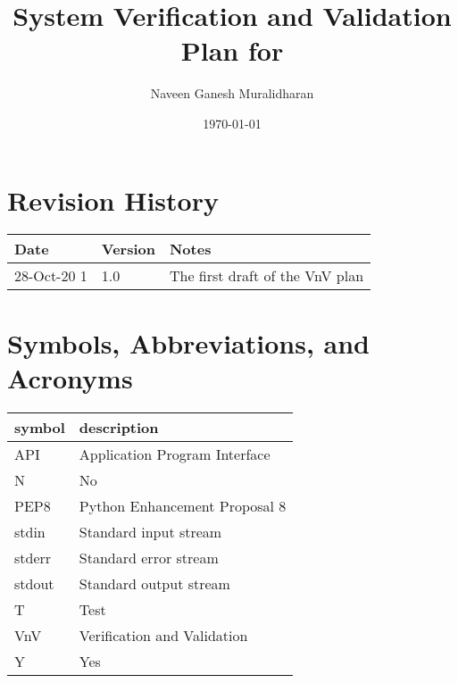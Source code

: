 \documentclass[12pt, titlepage]{article}
\begin{document}
\title{System Verification and Validation Plan for \progname{}} 
\author{Naveen Ganesh Muralidharan}
\date{\today}
	
\maketitle


\section{Revision History}

\begin{tabularx}{\textwidth}{p{3cm}p{2cm}X}
\toprule {\bf Date} & {\bf Version} & {\bf Notes}\\
\midrule
28-Oct-20 1 & 1.0 & The first draft of the VnV plan\\
\bottomrule
\end{tabularx}

\newpage

\tableofcontents

\listoftables

\newpage

\section{Symbols, Abbreviations, and Acronyms}

\renewcommand{\arraystretch}{1.2}
\begin{tabular}{l l} 
  \toprule		
  \textbf{symbol} & \textbf{description}\\
  \midrule 
  API & Application Program Interface\\
  N & No\\
  PEP8 & Python Enhancement Proposal 8\\
  stdin & Standard input stream\\
  stderr & Standard error stream\\
  stdout & Standard output stream\\
  T & Test\\
  VnV & Verification and Validation\\
  Y & Yes\\
  \bottomrule
\end{tabular}\\

\end{document}
